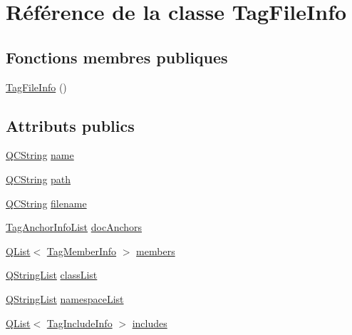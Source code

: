 \hypertarget{class_tag_file_info}{}\section{Référence de la classe Tag\+File\+Info}
\label{class_tag_file_info}
\subsection*{Fonctions membres publiques}
\begin{DoxyCompactItemize}
\item 
\hyperlink{class_tag_file_info_ac652ac7bb247bd46697df984f7eb7d61}{Tag\+File\+Info} ()
\end{DoxyCompactItemize}
\subsection*{Attributs publics}
\begin{DoxyCompactItemize}
\item 
\hyperlink{class_q_c_string}{Q\+C\+String} \hyperlink{class_tag_file_info_a2419c9a8697d9b7d640ac122c48273b1}{name}
\item 
\hyperlink{class_q_c_string}{Q\+C\+String} \hyperlink{class_tag_file_info_ae61e74f02e72cf90e0c27b5d9451a88e}{path}
\item 
\hyperlink{class_q_c_string}{Q\+C\+String} \hyperlink{class_tag_file_info_a4588a4b981099ed4633866a6c5636e6e}{filename}
\item 
\hyperlink{class_tag_anchor_info_list}{Tag\+Anchor\+Info\+List} \hyperlink{class_tag_file_info_aecec4d141a4948096764f7a1690fc005}{doc\+Anchors}
\item 
\hyperlink{class_q_list}{Q\+List}$<$ \hyperlink{class_tag_member_info}{Tag\+Member\+Info} $>$ \hyperlink{class_tag_file_info_a007e8381a72298b5fd057c8927384897}{members}
\item 
\hyperlink{class_q_string_list}{Q\+String\+List} \hyperlink{class_tag_file_info_a4dffcc2f55b135a52eb108c583a2e539}{class\+List}
\item 
\hyperlink{class_q_string_list}{Q\+String\+List} \hyperlink{class_tag_file_info_afba319f8f0d659de73f390627bb91a9e}{namespace\+List}
\item 
\hyperlink{class_q_list}{Q\+List}$<$ \hyperlink{class_tag_include_info}{Tag\+Include\+Info} $>$ \hyperlink{class_tag_file_info_acc05454624a34a3ce80c22205ace9524}{includes}
\end{DoxyCompactItemize}


